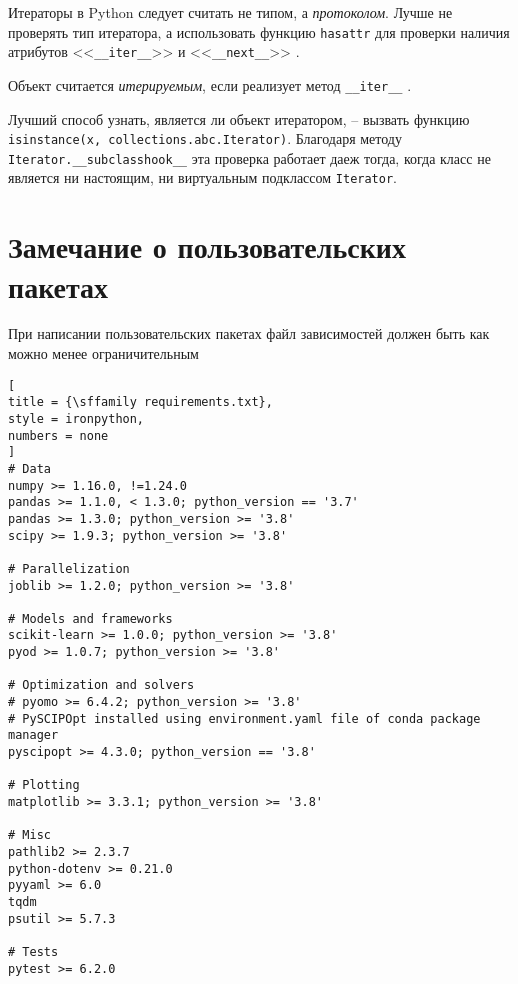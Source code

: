 \documentclass[%
	11pt,
	a4paper,
	utf8,
		]{article}
\begin{document}
Итераторы в Python следует считать не типом, а \emph{протоколом}. Лучше не проверять тип итератора, а использовать функцию \verb|hasattr| для проверки наличия атрибутов <<\verb*|__iter__|>> и <<\verb|__next__|>> \cite[]{ramalho:python-2022}.

Объект считается \emph{итерируемым}, если реализует метод \verb|__iter__| \cite[]{ramalho:python-2022}.

Лучший способ узнать, является ли объект итератором, -- вызвать функцию\\ \verb|isinstance(x, collections.abc.Iterator)|. Благодаря методу \verb|Iterator.__subclasshook__| эта проверка работает даеж тогда, когда класс не является ни настоящим, ни виртуальным подклассом \verb*|Iterator|.







\section{Замечание о пользовательских пакетах}

При написании пользовательских пакетах файл зависимостей должен быть как можно менее ограничительным
\begin{lstlisting}[
title = {\sffamily requirements.txt},
style = ironpython,
numbers = none
]
# Data
numpy >= 1.16.0, !=1.24.0
pandas >= 1.1.0, < 1.3.0; python_version == '3.7'
pandas >= 1.3.0; python_version >= '3.8'
scipy >= 1.9.3; python_version >= '3.8'

# Parallelization
joblib >= 1.2.0; python_version >= '3.8'

# Models and frameworks
scikit-learn >= 1.0.0; python_version >= '3.8'
pyod >= 1.0.7; python_version >= '3.8'

# Optimization and solvers
# pyomo >= 6.4.2; python_version >= '3.8'
# PySCIPOpt installed using environment.yaml file of conda package manager
pyscipopt >= 4.3.0; python_version == '3.8'

# Plotting
matplotlib >= 3.3.1; python_version >= '3.8'

# Misc
pathlib2 >= 2.3.7
python-dotenv >= 0.21.0
pyyaml >= 6.0
tqdm
psutil >= 5.7.3

# Tests
pytest >= 6.2.0
\end{lstlisting}
\end{document}
